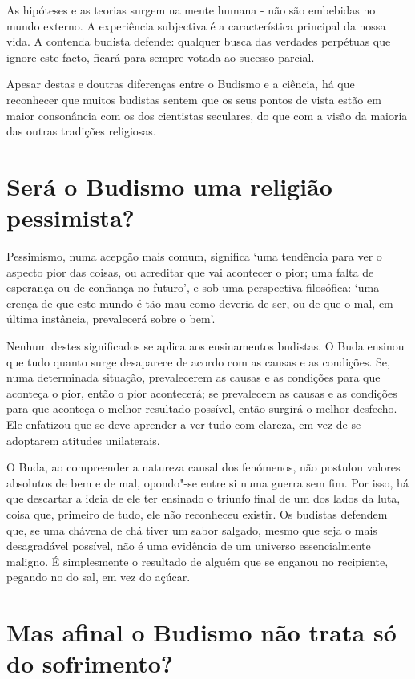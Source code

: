 As hipóteses e as teorias surgem na mente humana - não são embebidas no
mundo externo. A experiência subjectiva é a característica principal da
nossa vida. A contenda budista defende: qualquer busca das verdades
perpétuas que ignore este facto, ficará para sempre votada ao sucesso
parcial.

Apesar destas e doutras diferenças entre o Budismo e a ciência, há que
reconhecer que muitos budistas sentem que os seus pontos de vista estão
em maior consonância com os dos cientistas seculares, do que com a visão
da maioria das outras tradições religiosas.

\section{Será o Budismo uma religião pessimista?}

Pessimismo, numa acepção mais comum, significa `uma tendência para ver
o aspecto pior das coisas, ou acreditar que vai acontecer o pior; uma
falta de esperança ou de confiança no futuro', e sob uma perspectiva
filosófica: `uma crença de que este mundo é tão mau como deveria de
ser, ou de que o mal, em última instância, prevalecerá sobre o bem'.

Nenhum destes significados se aplica aos ensinamentos budistas. O Buda
ensinou que tudo quanto surge desaparece de acordo com as causas e as
condições. Se, numa determinada situação, prevalecerem as causas e as
condições para que aconteça o pior, então o pior acontecerá; se
prevalecem as causas e as condições para que aconteça o melhor resultado
possível, então surgirá o melhor desfecho. Ele enfatizou que se deve
aprender a ver tudo com clareza, em vez de se adoptarem atitudes
unilaterais.

O Buda, ao compreender a natureza causal dos fenómenos, não postulou
valores absolutos de bem e de mal, opondo"-se entre si numa guerra sem
fim. Por isso, há que descartar a ideia de ele ter ensinado o triunfo
final de um dos lados da luta, coisa que, primeiro de tudo, ele não
reconheceu existir. Os budistas defendem que, se uma chávena de chá
tiver um sabor salgado, mesmo que seja o mais desagradável possível, não
é uma evidência de um universo essencialmente maligno. É simplesmente o
resultado de alguém que se enganou no recipiente, pegando no do sal, em
vez do açúcar.

\section{Mas afinal o Budismo não trata só do sofrimento?}

